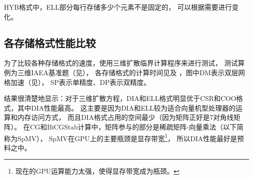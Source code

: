 HYB格式中，ELL部分每行存储多少个元素不是固定的，
可以根据需要进行变化。


\subsection{各存储格式性能比较}

为了比较各种存储格式的速度，使用三维扩散临界计算程序来进行测试，
测试算例为三维IAEA基准题（见），
各存储格式的计算时间见及
，图中DM表示双层网格加速（见），
SP表示单精度、DP表示双精度。

结果很清楚地显示：对于三维扩散方程，DIA和ELL格式明显优于CSR和COO格式，其中DIA性能最高。
这主要是因为DIA和ELL较为适合向量机型处理器的运算和内存访问方式，
而且DIA格式占用的空间最少（因为矩阵正好是7对角线矩阵）。
在CG和BiCGStab计算中，矩阵参与的部分是稀疏矩阵-向量乘法（以下简称为SpMV），
SpMV在GPU上的主要瓶颈是显存带宽\cite{bell2008spmv,baskaran2008optimizing}\footnote{现在的GPU运算能力太强，使得显存带宽成为瓶颈。}，
所以DIA性能最好是预料之中。

